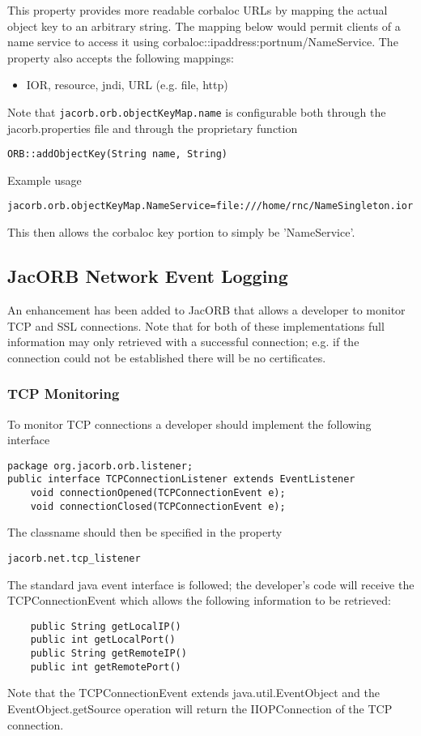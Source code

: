 {{This property provides more readable corbaloc URLs by mapping the actual object key to an arbitrary string. The mapping below would permit clients of a name service to access it using corbaloc::ipaddress:portnum/NameService. The property also accepts the following mappings:
\begin{itemize}
\item IOR, resource, jndi, URL (e.g. file, http)
\end{itemize}
Note that {\tt jacorb.orb.objectKeyMap.name} is configurable both through the jacorb.properties file and through the proprietary function

{\tt ORB::addObjectKey(String name, String)}

Example usage

{\tt jacorb.orb.objectKeyMap.NameService=file:///home/rnc/NameSingleton.ior}

This then allows the corbaloc key portion to simply be 'NameService'.

\subsection{JacORB Network Event Logging}
\label{eventLogging}

An enhancement has been added to JacORB that allows a developer to monitor TCP and SSL connections.
Note that for both of these implementations full information may only retrieved with a successful connection;
e.g. if the connection could not be established there will be no certificates.

\subsubsection{TCP Monitoring}

To monitor TCP connections a developer should implement the following interface
\begin{small}
\begin{verbatim}
package org.jacorb.orb.listener;
public interface TCPConnectionListener extends EventListener
    void connectionOpened(TCPConnectionEvent e);
    void connectionClosed(TCPConnectionEvent e);
\end{verbatim}
\end{small}
The classname should then be specified in the property
\begin{verbatim}
jacorb.net.tcp_listener
\end{verbatim}

The standard java event interface is followed; the developer's code will receive the
TCPConnectionEvent which allows the following information to be retrieved:
\begin{small}
\begin{verbatim}
    public String getLocalIP()
    public int getLocalPort()
    public String getRemoteIP()
    public int getRemotePort()
\end{verbatim}
\end{small}
Note that the TCPConnectionEvent extends java.util.EventObject and the EventObject.getSource
operation will return the IIOPConnection of the TCP connection.

}}
